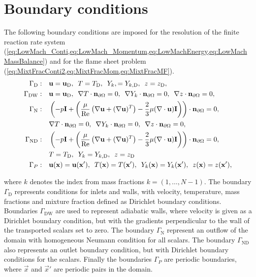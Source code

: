 \section{Boundary conditions}
The following boundary conditions are imposed for the resolution of the finite reaction rate system (\cref{eq:LowMach_Conti,eq:LowMach_Momentum,eq:LowMachEnergy,eq:LowMachMassBalance}) and for the flame sheet problem (\cref{eq:MixtFracConti2,eq:MixtFracMom,eq:MixtFracMF}).
\begin{subequations} 	
	\begin{align}
	\Gamma_{\text{D}}:\quad 
	&	\textbf{u} = \textbf{u}_{\text{D}},
	\,\,\,
	T = T_{\text{D}},
	\,\,\,
	Y_{k}, =Y_{k,{\text{D}}},
	\,\,\,
	z = z_{\text{D}},
	\label{eq:bc_d}\\
	\Gamma_{{\text{DW}}}:\quad
	&	\textbf{u} = \textbf{u}_{\text{D}},
	\,\,\,
	\nabla T \cdot \textbf{n}_{\partial \Omega} = 0,
	\,\,\,
	\nabla Y_{k} \cdot  \textbf{n}_{\partial \Omega}= 0,
	\,\,\, 		
	\nabla z \cdot \textbf{n}_{\partial \Omega} = 0,
	\label{eq:bc_dn}\\			
	\Gamma_{\text{N}}: \quad
	&	\left( -p \mathbf{I}	+ \left(\frac{\mu}{\text{Re}} \left(\nabla \textbf{u} + (\nabla \textbf{u})^T\right) - \frac{2}{3}\mu(\nabla \cdot \textbf{u})\mathbf{I}\right)\right)\cdot  \textbf{n}_{\partial \Omega} 	= 0, 
	\,\,\,\notag\\
	&
	\nabla T \cdot \textbf{n}_{\partial \Omega} = 0,
	\,\,\,
	\nabla  Y_{k} \cdot \textbf{n}_{\partial \Omega}= 0,
	\,\,\, 		
	\nabla z \cdot \textbf{n}_{\partial \Omega} = 0,
	\label{eq:bc_O}\\
	\Gamma_{\text{ND}}:\quad
	&	\left( -p \mathbf{I}	+ \left(\frac{\mu}{\text{Re}} \left(\nabla \textbf{u} + (\nabla \textbf{u})^T\right) - \frac{2}{3}\mu(\nabla \cdot \textbf{u})\mathbf{I}\right)\right)\cdot  \textbf{n}_{\partial \Omega} 	= 0, 
	\,\,\,\notag\\
	&T = T_{\text{D}},
	\,\,\,
	Y_{k} =  Y_{k,{\text{D}}},
	\,\,\,
	z = z_{\text{D}} 
	\label{eq:bc_OD}\\	
	\Gamma_{P}:\quad
	&	\textbf{u}(\textbf{x}) = \textbf{u}(\textbf{x}'),
	\,\,\,
	T(\textbf{x}) = T(\textbf{x}'),
	\,\,\,
	Y_{k}(\textbf{x}) =  Y_{k}(\textbf{x}'),
	\,\,\,
	z(\textbf{x}) = z(\textbf{x}'),
	\label{eq:bc_P}	
	\end{align}	
\end{subequations} 

where $k$ denotes the index from mass fractions $k = (1,\dots,N-1)$. The boundary $\Gamma_\text{D}$ represents conditions for inlets and walls, with velocity, temperature, mass fractions and mixture fraction defined as Dirichlet boundary conditions. Boundaries $\Gamma_\text{DW}$  are used to represent adiabatic walls, where velocity is given as a Dirichlet boundary condition, but with the gradients perpendicular to the wall of the transported scalars set to zero. The boundary $\Gamma_\text{N}$ represent an outflow of the domain with homogeneous Neumann condition for all scalars. The boundary $\Gamma_{\text{ND}}$ also  represents an outlet boundary condition, but with Dirichlet boundary conditions for the scalars. Finally the boundaries $\Gamma_P$ are periodic boundaries, where $\vec{x}$ and $\vec{x}'$ are periodic pairs in the domain.

\mycomment{
}